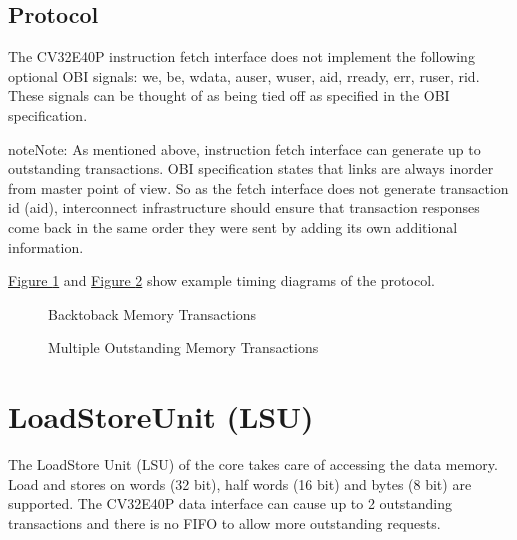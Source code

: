 \documentclass[letterpaper,10pt,english]{sphinxmanual}
\begin{document}
\section{Protocol}
\label{\detokenize{instruction_fetch:protocol}}
\sphinxAtStartPar
The CV32E40P instruction fetch interface does not implement the following optional OBI signals: we, be, wdata, auser, wuser, aid,
rready, err, ruser, rid. These signals can be thought of as being tied off as specified in the OBI specification.

\begin{sphinxadmonition}{note}{Note:}
\sphinxAtStartPar
{}
As mentioned above, instruction fetch interface can generate up to  outstanding transactions.
OBI specification states that links are always in\sphinxhyphen{}order from master point of view. So as the fetch interface does not generate transaction id (aid),
interconnect infrastructure should ensure that transaction responses come back in the same order they were sent by adding its own additional information.
\end{sphinxadmonition}

\sphinxAtStartPar
\hyperref[\detokenize{instruction_fetch:obi-instruction-basic}]{Figure \ref{\detokenize{instruction_fetch:obi-instruction-basic}}} and \hyperref[\detokenize{instruction_fetch:obi-instruction-multiple-outstanding}]{Figure \ref{\detokenize{instruction_fetch:obi-instruction-multiple-outstanding}}} show example timing diagrams of the protocol.

\begin{figure}[htbp]
\centering
\capstart

\noindent{}
\caption{Back\sphinxhyphen{}to\sphinxhyphen{}back Memory Transactions}\label{\detokenize{instruction_fetch:obi-instruction-basic}}\end{figure}

\begin{figure}[htbp]
\centering
\capstart

\noindent{}
\caption{Multiple Outstanding Memory Transactions}\label{\detokenize{instruction_fetch:obi-instruction-multiple-outstanding}}\end{figure}

\sphinxstepscope


\chapter{Load\sphinxhyphen{}Store\sphinxhyphen{}Unit (LSU)}
\label{\detokenize{load_store_unit:load-store-unit-lsu}}\label{\detokenize{load_store_unit:load-store-unit}}\label{\detokenize{load_store_unit::doc}}
\sphinxAtStartPar
The Load\sphinxhyphen{}Store Unit (LSU) of the core takes care of accessing the data memory. Load and
stores on words (32 bit), half words (16 bit) and bytes (8 bit) are
supported. The CV32E40P data interface can cause up to 2 outstanding
transactions and there is no FIFO to allow more outstanding requests.
\end{document}
